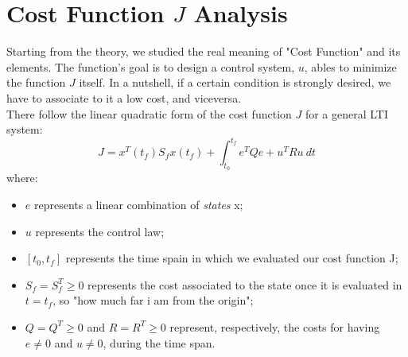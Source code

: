 \section{Cost Function $J$ Analysis}
Starting from the theory, we studied the real meaning of "Cost Function" and its elements. The function's goal is to design a control system, $u$, ables to minimize the function $J$ itself. In a nutshell, if a certain condition is strongly desired, we have to associate to it a low cost, and viceversa. \\
There follow the linear quadratic form of the cost function $J$ for a general LTI system:
\begin{equation}
J = x^{T}(t_{f}) S_{f} x(t_{f}) + \int_{t_{0}}^{t_{f}} e^{T} Q e + u^{T} R u \ dt
\end{equation}
where:
\begin{itemize}
	\item $e$ represents a linear combination of \textit{states} x;
	\item $u$ represents the control law;
	\item $ [t_{0},t_{f}] $ represents the time spain in which we evaluated our cost function J;
	\item $ S_{f} = S_{f}^{T} \geq0 $ represents the cost associated to the state once it is evaluated in $t=t_{f}$, so "how much far i am from the origin";
	\item $ Q=Q^{T}\geq 0 $ and $ R=R^{T}\geq 0 $ represent, respectively, the costs for having $e\neq0$ and $u\neq0$, during the time span.
\end{itemize}
